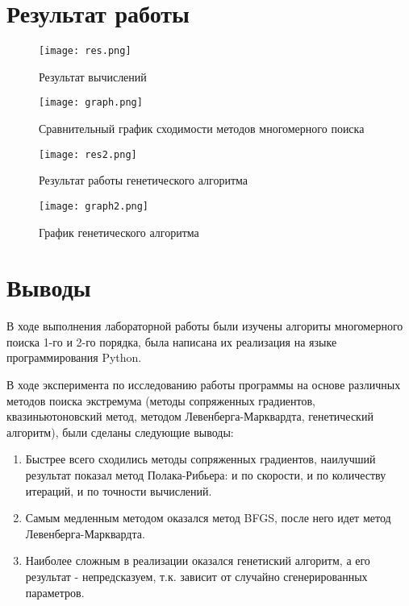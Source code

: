 \documentclass[a4paper, 14pt]{extarticle}
\begin{document}
\section{Результат работы}\label{Sect::res}

\begin{figure}[!ht]
    \centering
    \texttt{[image: res.png]}
    \caption{Результат вычислений}
    \label{fig:enter-label}
\end{figure}

\begin{figure}[!ht]
    \centering
    \texttt{[image: graph.png]}
    \caption{Сравнительный график сходимости методов многомерного поиска}
    \label{fig:enter-label}
\end{figure}

\begin{figure}[!ht]
    \centering
    \texttt{[image: res2.png]}
    \caption{Результат работы генетического алгоритма}
    \label{fig:enter-label}
\end{figure}

\begin{figure}[!ht]
    \centering
    \texttt{[image: graph2.png]}
    \caption{График генетического алгоритма}
    \label{fig:enter-label}
\end{figure}

\section{Выводы}\label{Sect::sum}
В ходе выполнения лабораторной работы были изучены алгориты многомерного поиска 1-го и 2-го порядка, была написана их реализация на языке программирования Python. 

В ходе эксперимента по исследованию работы программы на основе различных методов поиска экстремума (методы сопряженных градиентов, квазиньютоновский метод, методом Левенберга-Марквардта, генетический алгоритм), были сделаны следующие выводы:
\begin{enumerate}
\item Быстрее всего сходились методы сопряженных градиентов, наилучший результат показал метод Полака-Рибьера: и по скорости, и по количеству итераций, и по точности вычислений.
\item Самым медленным методом оказался метод BFGS, после него идет метод Левенберга-Марквардта.
\item Наиболее сложным в реализации оказался генетиский алгоритм, а его результат - непредсказуем, т.к. зависит от случайно сгенерированных параметров.
\end{enumerate}
\end{document}
